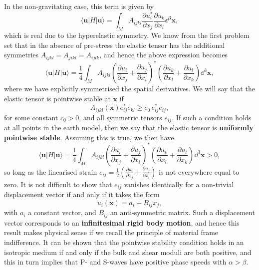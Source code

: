 In the non-gravitating case, this term is given by
\begin{equation}
\langle \mathbf{u}|H|\mathbf{u}\rangle=\int_{M}A_{ijkl}\frac{\partial u_{i}^{*}}{\partial x_{j}}\frac{\partial u_{k}}{\partial x_{l}}\dd^{3}\mathbf{x},
\label{eq:39}
\end{equation}
which is real due to the hyperelastic symmetry. We know from the first problem set that in the absence of pre-stress the elastic tensor has the additional 
symmetries $A_{ijkl}=A_{jikl}=A_{ijlk}$, and hence the above expression becomes
\begin{equation}
\langle \mathbf{u}|H|\mathbf{u}\rangle=\frac{1}{4}\int_{M}A_{ijkl}\left(\frac{\partial u_{i}}{\partial x_{j}}
+\frac{\partial u_{j}}{\partial x_{i}}\right)^{*}\left(\frac{\partial u_{k}}{\partial x_{l}}+\frac{\partial u_{l}}{\partial x_{k}}\right)\dd^{3}\mathbf{x},
\label{eq:40}
\end{equation}
where we have explicitly symmetrised the spatial derivatives. We will say that the elastic tensor is pointwise stable at $\mathbf{x}$ if
\begin{equation}
A_{ijkl}(\mathbf{x})e_{ij}^{*}e_{kl}\ge c_{0}\,e_{ij}^{*}e_{ij},
\label{eq:41}
\end{equation}
for some constant $c_{0}>0$, and all symmetric tensors $e_{ij}$. If such a condition holds at all points in the earth model, then we say that the elastic tensor is \textbf{uniformly pointwise stable}.
Assuming this is true, we then have
\begin{equation}
\langle \mathbf{u}|H|\mathbf{u}\rangle=\frac{1}{4}\int_{M}A_{ijkl}\left(\frac{\partial u_{i}}{\partial x_{j}}+\frac{\partial u_{j}}
{\partial x_{i}}\right)^{*}\left(\frac{\partial u_{k}}{\partial x_{l}}+\frac{\partial u_{l}}{\partial x_{k}}\right)\dd^{3}\mathbf{x}>0,
\label{eq:42}
\end{equation}
so long as the linearised strain $e_{ij}=\frac{1}{2}\left(\frac{\partial u_{i}}{\partial x_{j}}+\frac{\partial u_{j}}{\partial x_{i}}\right)$ is not everywhere equal to zero. It is not difficult to 
show that $e_{ij}$ vanishes identically for a non-trivial displacement vector if and only if it takes the form
\begin{equation}
u_{i}(\mathbf{x})=a_{i}+B_{ij}x_{j},
\label{eq:43}
\end{equation}
with $a_{i}$ a constant vector, and $B_{ij}$ an anti-symmetric matrix. Such a displacement vector corresponds to an \textbf{infinitesimal 
rigid body motion}, and hence this result makes physical sense if we recall the principle of material frame indifference. It can be shown 
that the pointwise stability condition holds in an isotropic medium if and only if the bulk and shear moduli are both positive, and this in turn 
implies that P- and S-waves have positive phase speeds with $\alpha>\beta$. 

